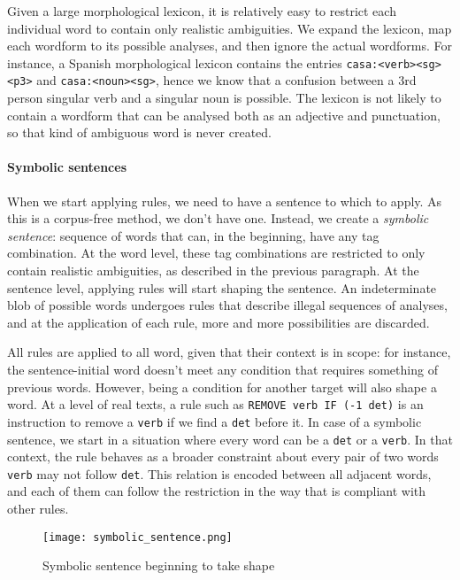Given a large morphological lexicon, it is relatively easy to restrict each individual word to contain only realistic ambiguities. We expand the lexicon, map each wordform to its possible analyses, and then ignore the actual wordforms. For instance, a Spanish morphological lexicon contains the entries \texttt{casa:<verb><sg><p3>} and \texttt{casa:<noun><sg>}, hence we know that a confusion between a 3rd person singular verb and a singular noun is possible. The lexicon is not likely to contain a wordform that can be analysed both as an adjective and punctuation, so that kind of ambiguous word is never created.


\paragraph{Symbolic sentences}

When we start applying rules, we need to have a sentence to which to apply.
As this is a corpus-free method, we don't have one.
Instead, we create a \emph{symbolic sentence}: sequence of words that can, in the beginning, have any tag combination.
At the word level, these tag combinations are restricted to only contain realistic ambiguities, as described in the previous paragraph.
At the sentence level, applying rules will start shaping the sentence.
An indeterminate blob of possible words undergoes rules that describe illegal sequences of analyses,
and at the application of each rule, more and more possibilities are discarded.

All rules are applied to all word, given that their context is in scope: for instance, the sentence-initial word doesn't meet any condition that requires something of previous words.
However, being a condition for another target will also shape a word.
At a level of real texts, a rule such as \texttt{REMOVE verb IF (-1 det)} is an instruction to remove a \texttt{verb} if we find a \texttt{det} before it.
In case of a symbolic sentence, we start in a situation where every word can be a \texttt{det} or a \texttt{verb}. In that context, the rule behaves as a broader constraint about every pair of two words \texttt{verb} may not follow \texttt{det}. This relation is encoded between all adjacent words, and each of them can follow the restriction in the way that is compliant with other rules.

\begin{figure}[]

\texttt{[image: symbolic\_sentence.png]}

\caption{Symbolic sentence beginning to take shape}
\label{fig:example}
\end{figure}


